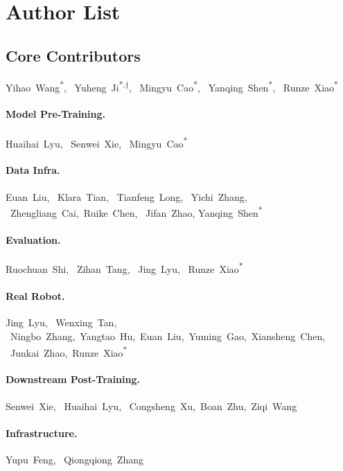 \section{Author List}\label{sec:contributors}


\subsection{Core Contributors} 
Yihao~Wang\textsuperscript{*}, \
Yuheng~Ji\textsuperscript{*,$\dagger$}, \ 
Mingyu~Cao\textsuperscript{*}, \
Yanqing~Shen\textsuperscript{*}, \
Runze~Xiao\textsuperscript{*}


\paragraph{Model Pre-Training.} 
Huaihai~Lyu, \
Senwei~Xie, \
Mingyu~Cao\textsuperscript{*}


\paragraph{Data Infra.}
Euan~Liu, \
Klara~Tian, \
Tianfeng~Long, \
Yichi~Zhang, \
Zhengliang~Cai,\
Ruike~Chen,  \
Jifan~Zhao, Yanqing~Shen\textsuperscript{*} 


\paragraph{Evaluation.} 
Ruochuan~Shi, \
Zihan~Tang, \
Jing~Lyu, \
Runze~Xiao\textsuperscript{*}

\paragraph{Real Robot.}
Jing~Lyu, \
Wenxing~Tan, \
Ningbo~Zhang,\ 
Yangtao~Hu,\
Euan~Liu,\
Yuming~Gao,\
Xiansheng~Chen, \
Junkai~Zhao,\
Runze~Xiao\textsuperscript{*}

\paragraph{Downstream Post-Training.}
Senwei~Xie, \
Huaihai~Lyu, \
Congsheng~Xu,\
Boan~Zhu,\
Ziqi~Wang

\paragraph{Infrastructure.} 
Yupu~Feng, \
Qiongqiong~Zhang


